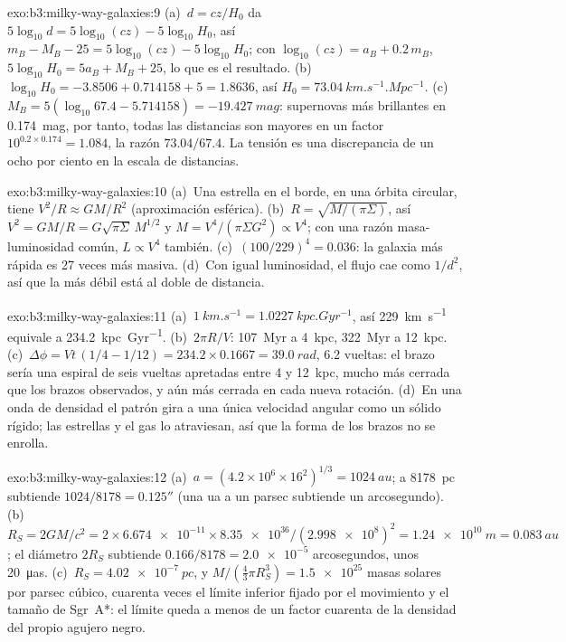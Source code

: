 \begin{solution}{exo:b3:milky-way-galaxies:9}
(a)~$d = cz/H_0$ da $5\log_{10}d = 5\log_{10}(cz) - 5\log_{10}H_0$,
así $m_B - M_B - 25 = 5\log_{10}(cz) - 5\log_{10}H_0$; con
$\log_{10}(cz) = a_B + 0.2\,m_B$, $5\log_{10}H_0 = 5a_B + M_B + 25$, lo que
es el resultado. (b)~$\log_{10}H_0 = -3.8506 + 0.714158 + 5 = 1.8636$, así
$H_0 = \qty{73.04}{km.s^{-1}.Mpc^{-1}}$. (c)~$M_B = 5(\log_{10}67.4 -
5.714158) = \qty{-19.427}{mag}$: supernovas más brillantes en \qty{0.174}{mag},
por tanto, todas las distancias son mayores en un factor $10^{0.2\times0.174} = 1.084$, la
razón $73.04/67.4$. La tensión es una discrepancia de un ocho por ciento en la
escala de distancias.
\end{solution}

\begin{solution}{exo:b3:milky-way-galaxies:10}
(a)~Una estrella en el borde, en una órbita circular, tiene $V^2/R \approx GM/R^2$
(aproximación esférica). (b)~$R = \sqrt{M/(\pi\Sigma)}$, así $V^2 =
GM/R = G\sqrt{\pi\Sigma}\,M^{1/2}$ y $M = V^4/(\pi\Sigma G^2) \propto
V^4$; con una razón masa-luminosidad común, $L \propto V^4$ también.
(c)~$(100/229)^4 = \num{0.036}$: la galaxia más rápida es 27 veces más
masiva. (d)~Con igual luminosidad, el flujo cae como $1/d^2$, así que la más
débil está al doble de distancia.
\end{solution}

\begin{solution}{exo:b3:milky-way-galaxies:11}
(a)~$\qty{1}{km.s^{-1}} = \qty{1.0227}{kpc.Gyr^{-1}}$, así
\qty{229}{km.s^{-1}} equivale a \qty{234.2}{kpc.Gyr^{-1}}. (b)~$2\pi R/V$:
\qty{107}{Myr} a \qty{4}{kpc}, \qty{322}{Myr} a \qty{12}{kpc}.
(c)~$\Delta\phi = Vt\,(1/4 - 1/12) = 234.2\times0.1667 = \qty{39.0}{rad}$,
6.2 vueltas: el brazo sería una espiral de seis vueltas apretadas entre 4 y
\qty{12}{kpc}, mucho más cerrada que los brazos observados, y aún más cerrada en cada
nueva rotación. (d)~En una onda de densidad el patrón gira a una única velocidad angular
como un sólido rígido; las estrellas y el gas lo atraviesan, así que la forma
de los brazos no se enrolla.
\end{solution}

\begin{solution}{exo:b3:milky-way-galaxies:12}
(a)~$a = (4.2\times10^6\times16^2)^{1/3} = \qty{1024}{au}$; a
\qty{8178}{pc} subtiende $1024/8178 = \ang{;;0.125}$ (una ua a un parsec
subtiende un arcosegundo). (b)~$R_S = 2GM/c^2 = 2\times\num{6.674e-11}
\times\num{8.35e36}/(\num{2.998e8})^2 = \qty{1.24e10}{m} = \qty{0.083}{au}$;
el diámetro $2R_S$ subtiende $0.166/8178 = \num{2.0e-5}$ arcosegundos, unos
\qty{20}{\micro as}. (c)~$R_S = \qty{4.02e-7}{pc}$, y $M/(\tfrac43\pi
R_S^3) = \num{1.5e25}$ masas solares por parsec cúbico, cuarenta veces el
límite inferior fijado por el movimiento y el tamaño de Sgr~A*: el límite queda a
menos de un factor cuarenta de la densidad del propio agujero negro.
\end{solution}

